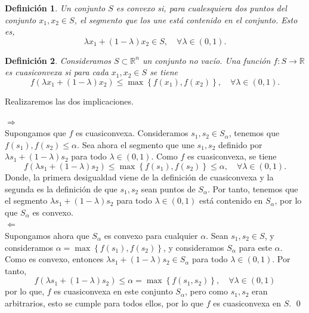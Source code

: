 \documentclass[a4paper]{article}
\newcommand{\R}{\mathbb R}
\newtheorem{ndef}{Definición}
\begin{document}
\begin{ndef}
  Un conjunto \(S\) es convexo si, para cualesquiera dos puntos del conjunto \(x_{1},x_{2} \in S\), el segmento que los une está contenido en el conjunto. Esto es,
  \[
    \lambda x_{1} + (1-\lambda)x_{2} \in S, \quad \forall \lambda \in (0,1).
  \]
\end{ndef}

\begin{ndef}
  Consideramos \(S \subset \R^{n}\) un conjunto no vacío. Una función \(f:S\to \R\) es cuasiconvexa si para cada \(x_{1},x_{2} \in S\) se tiene
  \[
    f(\lambda x_{1} + (1-\lambda)x_{2}) \leq \max \left\{f(x_{1}), f(x_{2})\right\}, \quad \forall \lambda \in (0,1).
  \]
\end{ndef}

Realizaremos las dos implicaciones.

\(\boxed{\Rightarrow}\)\\

Supongamos que \(f\) es cuasiconvexa. Consideramos \(s_{1},s_{2} \in S_{\alpha}\), tenemos que \(f(s_{1}), f(s_{2}) \leq \alpha\). Sea ahora el segmento que une \(s_{1},s_{2}\) definido por \(\lambda s_{1} + (1-\lambda)s_{2}\) para todo \(\lambda \in (0,1)\). Como \(f\) es cuasiconvexa, se tiene
\[
f\left(\lambda s_{1} + (1-\lambda)s_{2}\right) \leq \max \left\{ f\left(s_{1}\right),f\left(s_{2}\right)\right\} \leq \alpha, \quad \forall \lambda \in (0,1).
\]
Donde, la primera desigualdad viene de la definición de cuasiconvexa y la segunda es la definición de que  \(s_{1},s_{2}\) sean puntos de \(S_{\alpha}\).
Por tanto, tenemos que el segmento \(\lambda s_{1} + (1-\lambda)s_{2}\) para todo \(\lambda \in (0,1)\) está contenido en \( S_{\alpha}\), por lo que \(S_{\alpha}\) es convexo.\\

\(\boxed{\Leftarrow}\)\\
Supongamos ahora que \(S_{\alpha}\) es convexo para cualquier \(\alpha\). Sean \(s_{1},s_{2} \in S\), y consideramos \(\alpha = \max \left\{f(s_{1}),f(s_{2}) \right\}\), y consideramos \(S_{\alpha}\) para este \(\alpha\). Como es convexo, entonces \(\lambda s_{1} + (1-\lambda)s_{2} \in S_{\alpha}\) para todo \(\lambda \in (0,1)\). Por tanto,
\[
f(\lambda s_{1} + (1-\lambda)s_{2}) \leq \alpha = \max \left\{f(s_{1},s_{2})\right\}, \quad \forall \lambda \in (0,1)
\]
por lo que, \(f\) es cuasiconvexa en este conjunto \(S_{\alpha}\), pero como \(s_{1},s_{2}\) eran arbitrarios, esto se cumple para todos ellos, por lo que \(f\) es cuasiconvexa en \(S\). \qed
\end{document}
